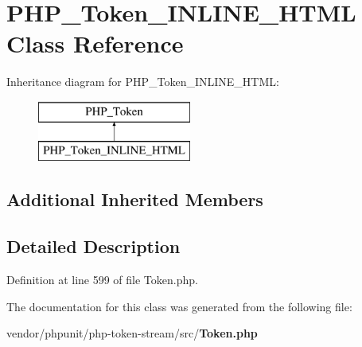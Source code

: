 \section{P\+H\+P\+\_\+\+Token\+\_\+\+I\+N\+L\+I\+N\+E\+\_\+\+H\+T\+M\+L Class Reference}
\label{class_p_h_p___token___i_n_l_i_n_e___h_t_m_l}
Inheritance diagram for P\+H\+P\+\_\+\+Token\+\_\+\+I\+N\+L\+I\+N\+E\+\_\+\+H\+T\+M\+L\+:\begin{figure}[H]
\begin{center}
\leavevmode
\includegraphics[height=2.000000cm]{class_p_h_p___token___i_n_l_i_n_e___h_t_m_l}
\end{center}
\end{figure}
\subsection*{Additional Inherited Members}


\subsection{Detailed Description}


Definition at line 599 of file Token.\+php.



The documentation for this class was generated from the following file\+:\begin{DoxyCompactItemize}
\item 
vendor/phpunit/php-\/token-\/stream/src/{\bf Token.\+php}\end{DoxyCompactItemize}
